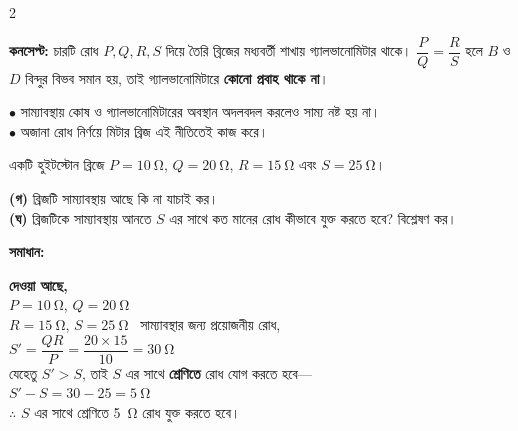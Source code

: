 \documentclass[10pt,twoside]{article}
\begin{document}
\begin{multicols}{2}
\columnbreak
{}
\begin{conceptbox}
\textbf{কনসেপ্ট:} চারটি রোধ $P,Q,R,S$ দিয়ে তৈরি ব্রিজের মধ্যবর্তী শাখায় গ্যালভানোমিটার থাকে। $\dfrac{P}{Q}=\dfrac{R}{S}$ হলে $B$ ও $D$ বিন্দুর বিভব সমান হয়, তাই গ্যালভানোমিটারে \textbf{কোনো প্রবাহ থাকে না}।
\begin{roundbox}[left=3pt,top=2pt,bottom=2pt]
$\bullet$ সাম্যাবস্থায় কোষ ও গ্যালভানোমিটারের অবস্থান অদলবদল করলেও সাম্য নষ্ট হয় না।\\
$\bullet$ অজানা রোধ নির্ণয়ে মিটার ব্রিজ এই নীতিতেই কাজ করে।
\end{roundbox}
\end{conceptbox}
\medskip
{} একটি হুইটস্টোন ব্রিজে $P=\SI{10}{\ohm}$, $Q=\SI{20}{\ohm}$, $R=\SI{15}{\ohm}$ এবং $S=\SI{25}{\ohm}$।\par
\textbf{(গ)} ব্রিজটি সাম্যাবস্থায় আছে কি না যাচাই কর।\\
\textbf{(ঘ)} ব্রিজটিকে সাম্যাবস্থায় আনতে $S$ এর সাথে কত মানের রোধ কীভাবে যুক্ত করতে হবে? বিশ্লেষণ কর।\par\smallskip
\textbf{সমাধান:}\par
{}
{\textbf{দেওয়া আছে,}\\ $P=\SI{10}{\ohm}$, $Q=\SI{20}{\ohm}$\\ $R=\SI{15}{\ohm}$, $S=\SI{25}{\ohm}$}
\ সাম্যাবস্থার জন্য প্রয়োজনীয় রোধ,\\
$S'=\dfrac{QR}{P}=\dfrac{20\times15}{10}=\SI{30}{\ohm}$\\[2pt]
যেহেতু $S'>S$, তাই $S$ এর সাথে \textbf{শ্রেণিতে} রোধ যোগ করতে হবে—\\
$S'-S=30-25=\SI{5}{\ohm}$\\[2pt]
$\therefore$ $S$ এর সাথে শ্রেণিতে \SI{5}{\ohm} রোধ যুক্ত করতে হবে।\ans
\end{multicols}
\end{document}
